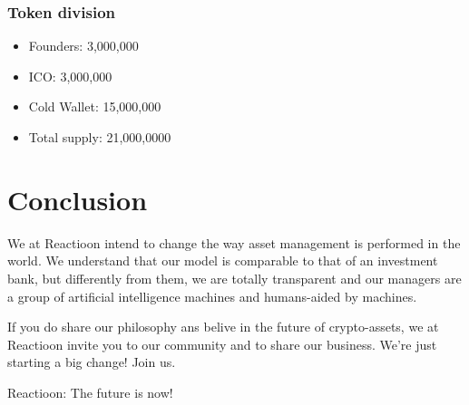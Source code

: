 \documentclass[
	article,			%
	12pt,				%
	oneside,			%
	a4paper,			%
	brazil,				%
	english,
	sumario=tradicional
	]{abntex2}
\begin{document}
\subsubsection{Token division}
\begin{itemize}
    \item [] Founders: 3,000,000
    
    \item [] ICO: 3,000,000

    \item [] Cold Wallet: 15,000,000

    \item [] Total supply: 21,000,0000

\end{itemize}

\section{Conclusion}

We at Reactioon intend to change the way asset management is performed in the world. We understand that our model is comparable to that of an investment bank, but differently from them, we are totally transparent and our managers are a group of artificial intelligence machines and humans-aided by machines.

If you do share our philosophy ans belive in the future of crypto-assets, we at Reactioon invite you to our community and to share our business. We're just starting a big change! Join us. 


Reactioon: The future is now!





\end{document}
